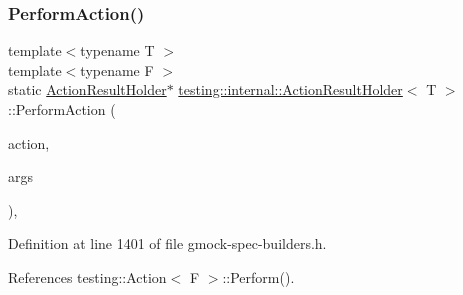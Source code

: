 \subsubsection{\texorpdfstring{Perform\+Action()}{PerformAction()}}
{\footnotesize\ttfamily template$<$typename T $>$ \\
template$<$typename F $>$ \\
static \hyperlink{classtesting_1_1internal_1_1ActionResultHolder}{Action\+Result\+Holder}$\ast$ \hyperlink{classtesting_1_1internal_1_1ActionResultHolder}{testing\+::internal\+::\+Action\+Result\+Holder}$<$ T $>$\+::Perform\+Action (\begin{DoxyParamCaption}\item[{const \hyperlink{classtesting_1_1Action}{Action}$<$ F $>$ \&}]{action,  }\item[{const typename \hyperlink{structtesting_1_1internal_1_1Function}{Function}$<$ F $>$\+::Argument\+Tuple \&}]{args }\end{DoxyParamCaption})\hspace{0.3cm}{\ttfamily [inline]}, {\ttfamily [static]}}



Definition at line 1401 of file gmock-\/spec-\/builders.\+h.



References testing\+::\+Action$<$ F $>$\+::\+Perform().


